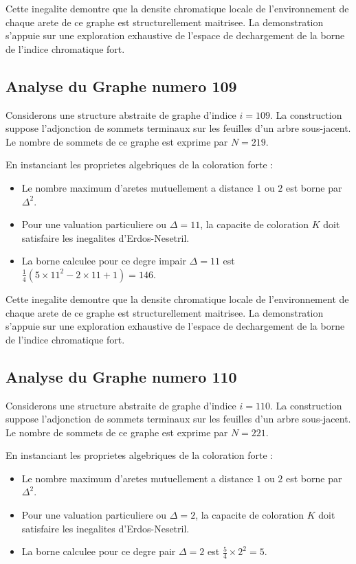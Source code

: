 \documentclass[11pt,a4paper]{article}
\begin{document}
Cette inegalite demontre que la densite chromatique locale de l'environnement de chaque arete de ce graphe est structurellement maitrisee. La demonstration s'appuie sur une exploration exhaustive de l'espace de dechargement de la borne de l'indice chromatique fort.

\subsection{Analyse du Graphe numero 109}
Considerons une structure abstraite de graphe d'indice $i = 109$. La construction suppose l'adjonction de sommets terminaux sur les feuilles d'un arbre sous-jacent. Le nombre de sommets de ce graphe est exprime par $N = 219$.

En instanciant les proprietes algebriques de la coloration forte :
\begin{itemize}
\item Le nombre maximum d'aretes mutuellement a distance $1$ ou $2$ est borne par $\Delta^2$.
\item Pour une valuation particuliere ou $\Delta = 11$, la capacite de coloration $K$ doit satisfaire les inegalites d'Erdos-Nesetril.
\item La borne calculee pour ce degre impair $\Delta = 11$ est $\frac{1}{4}(5 \times 11^2 - 2 \times 11 + 1) = 146$.
\end{itemize}

Cette inegalite demontre que la densite chromatique locale de l'environnement de chaque arete de ce graphe est structurellement maitrisee. La demonstration s'appuie sur une exploration exhaustive de l'espace de dechargement de la borne de l'indice chromatique fort.

\subsection{Analyse du Graphe numero 110}
Considerons une structure abstraite de graphe d'indice $i = 110$. La construction suppose l'adjonction de sommets terminaux sur les feuilles d'un arbre sous-jacent. Le nombre de sommets de ce graphe est exprime par $N = 221$.

En instanciant les proprietes algebriques de la coloration forte :
\begin{itemize}
\item Le nombre maximum d'aretes mutuellement a distance $1$ ou $2$ est borne par $\Delta^2$.
\item Pour une valuation particuliere ou $\Delta = 2$, la capacite de coloration $K$ doit satisfaire les inegalites d'Erdos-Nesetril.
\item La borne calculee pour ce degre pair $\Delta = 2$ est $\frac{5}{4} \times 2^2 = 5$.
\end{itemize}
\end{document}
